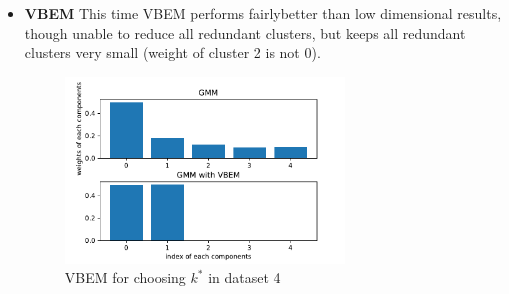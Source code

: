 \documentclass[12pt,a4paper,UTF8,fntef]{article}
\begin{document}
\begin{enumerate}
\begin{itemize}
	10-dimensional data cannot be visualized, though AIC and BIC still agree with each other. A major change is that spherical model is selected, which agrees with the way I generated 10-dim data\textemdash for convenience I did not apply transformation to the data drawn from the standard Gaussian distribution.
	\item \textbf{VBEM}\newline
	This time VBEM performs fairly\textemdash better than low dimensional results, though unable to reduce all redundant clusters, but keeps all redundant clusters very small (weight of cluster 2 is not 0).
	\begin{figure}[!h]
		\centering
		\includegraphics[width=0.7\textwidth]{VBEM_4.pdf}
		\caption{VBEM for choosing $k^*$ in dataset 4}
	\end{figure}
\end{itemize}
\end{enumerate}
\end{document}
